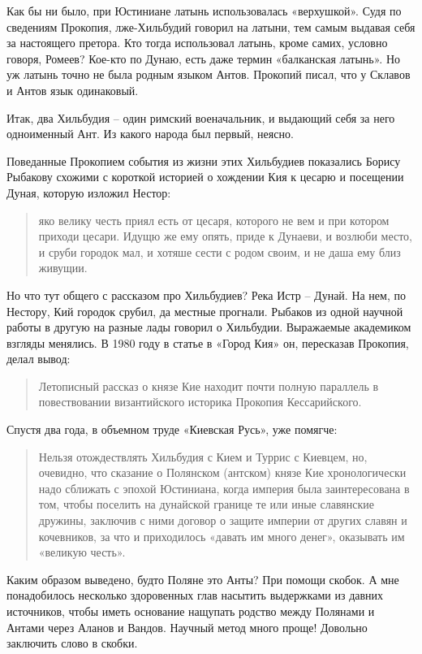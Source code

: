 Как бы ни было, при Юстиниане латынь использовалась «верхушкой». Судя по сведениям Прокопия, лже-Хильбудий говорил на латыни, тем самым выдавая себя за настоящего претора. Кто тогда использовал латынь, кроме самих, условно говоря, Ромеев? Кое-кто по Дунаю, есть даже термин «балканская латынь». Но уж латынь точно не была родным языком Антов. Прокопий писал, что у Склавов и Антов язык одинаковый.

Итак, два Хильбудия – один римский военачальник, и выдающий себя за него одноименный Ант. Из какого народа был первый, неясно.

Поведанные Прокопием события из жизни этих Хильбудиев показались Борису Рыбакову схожими с короткой историей о хождении Кия к цесарю и посещении Дуная, которую изложил Нестор:

\begin{quotation}
яко велику честь приял есть от цесаря, которого не вем и при котором приходи цесари. Идущю же ему опять, приде к Дунаеви, и возлюби место, и сруби городок мал, и хотяше сести с родом своим, и не даша ему близ живущии.
\end{quotation}

Но что тут общего с рассказом про Хильбудиев? Река Истр – Дунай. На нем, по Нестору, Кий городок срубил, да местные прогнали. Рыбаков из одной научной работы в другую на разные лады говорил о Хильбудии. Выражаемые академиком взгляды менялись. В 1980 году в статье в «Город Кия» он, пересказав Прокопия, делал вывод: 

\begin{quotation}
Летописный рассказ о князе Кие находит почти полную параллель в повествовании византийского историка Прокопия Кессарийского. 
\end{quotation}

Спустя два года, в объемном труде «Киевская Русь», уже помягче: 

\begin{quotation}
Нельзя отождествлять Хильбудия с Кием и Туррис с Киевцем, но, очевидно, что сказание о Полянском (антском) князе Кие хронологически надо сближать с эпохой Юстиниана, когда империя была заинтересована в том, чтобы поселить на дунайской границе те или иные славянские дружины, заключив с ними договор о защите империи от других славян и кочевников, за что и приходилось «давать им много денег», оказывать им «великую честь».
\end{quotation}

Каким образом выведено, будто Поляне это Анты? При помощи скобок. А мне понадобилось несколько здоровенных глав насытить выдержками из давних источников, чтобы иметь основание нащупать родство между Полянами и Антами через Аланов и Вандов. Научный метод много проще! Довольно заключить слово в скобки.

